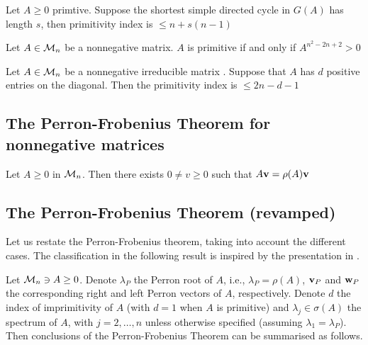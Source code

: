\documentclass[aspectratio=169]{beamer}
\begin{document}
\begin{frame}
\begin{theorem}
Let $A\geq 0$ primtive. Suppose the shortest simple directed cycle in $G(A)$ has length $s$, then primitivity index is $\leq n+s(n-1)$
\end{theorem}
\vfill
\begin{theorem}
Let $A\in \mathcal{M}_n$ be a nonnegative matrix. $A$ is primitive if and only if $A^{n^2-2n+2}>0$
\end{theorem}
\vfill
\begin{theorem}
Let $A\in \mathcal{M}_n$ be a nonnegative irreducible matrix . Suppose that $A$ has $d$ positive entries on the diagonal. Then the primitivity index is $\leq 2n-d-1$
\end{theorem}
\end{frame}


\subsection{The Perron-Frobenius Theorem for nonnegative matrices}
\label{sec:PF_nonnegative_matrices}


\begin{frame}
\begin{theorem}
Let $A\geq 0$ in $\mathcal{M}_n$. Then there exists $0\neq v\geq 0$ such that $A\mathbf{v}= \rho(A)\mathbf{v}$
\end{theorem}
\end{frame}

\subsection{The Perron-Frobenius Theorem (revamped)}
\label{sec:PF_summary}

\begin{frame}
Let us restate the Perron-Frobenius theorem, taking into account the different cases.
The classification in the following result is inspired by the presentation in \cite{Caswell2001}.
\begin{theorem}\label{th:PF_allCases}
Let $\mathcal{M}_n\ni A\geq 0$. Denote $\lambda_P$ the Perron root of $A$, i.e., $\lambda_P=\rho(A)$, $\mathbf{v}_P$ and $\mathbf{w}_P$ the corresponding right and left Perron vectors of $A$, respectively. 
Denote $d$ the index of imprimitivity of $A$ (with $d=1$ when $A$ is primitive) and $\lambda_j\in\sigma(A)$ the spectrum of $A$, with $j=2,\ldots,n$ unless otherwise specified (assuming $\lambda_1=\lambda_P$).
Then conclusions of the Perron-Frobenius Theorem can be summarised as follows.
\end{theorem}
\end{frame}
\end{document}

